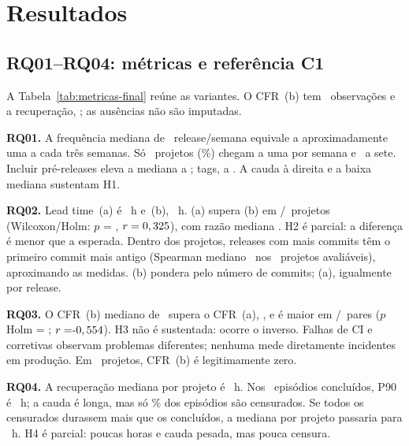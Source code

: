 \section{Resultados}
\label{sec:resultados}

\subsection{RQ01--RQ04: métricas e referência C1}

A Tabela~\ref{tab:metricas-final} reúne as variantes. O CFR~(b) tem
\labACfrBN\ observações e a recuperação, \labARecN; as ausências não são imputadas.

\begin{table}[htbp]
\centering\footnotesize
\caption{Medianas e quartis; peso igual por projeto, exceto episódios na última linha.}
\label{tab:metricas-final}

\end{table}

\textbf{RQ01.} A frequência mediana de \labAFreqMediana\ release/semana equivale
a aproximadamente uma a cada três semanas. Só \labAFreqSemanais\ projetos
(\labAFreqSemanaisPct\%) chegam a uma por semana e \labAFreqDiarios\ a sete.
Incluir pré-releases eleva a mediana a \labAFreqPreMediana; tags, a
\labAFreqTagsMediana. A cauda à direita e a baixa mediana sustentam H1.

\textbf{RQ02.} Lead time~(a) é \labALeadAMediana~h e~(b), \labALeadBMediana~h.
(a) supera (b) em \labALeadXMaior/\labALeadAN\ projetos (Wilcoxon/Holm:
$p$ = \labALeadPHolm, $r=0,325$), com razão mediana \labALeadRazao.
H2 é parcial: a diferença é menor que a esperada. Dentro dos projetos, releases
com mais commits têm o primeiro commit mais antigo (Spearman mediano
\labALeadRhoMediano\ nos \labALeadProjetosRho\ projetos avaliáveis), aproximando
as medidas. (b) pondera pelo número de commits; (a), igualmente por release.

\textbf{RQ03.} O CFR~(b) mediano de \labACfrBMediana\ supera o CFR~(a),
\labACfrAMediana, e é maior em \labACfrXMenor/\labACfrBN\ pares
($p$ Holm = \labACfrPHolm; $r=\labACfrR$). H3 não é sustentada: ocorre o inverso.
Falhas de CI e corretivas observam problemas diferentes; nenhuma mede diretamente
incidentes em produção. Em \labACfrBZeros\ projetos, CFR~(b) é legitimamente zero.

\textbf{RQ04.} A recuperação mediana por projeto é \labARecMediana~h.
Nos \labAEpN\ episódios concluídos, P90 é \labAEpPNoventa~h; a cauda é longa,
mas só \labAEpCensuradosPct\% dos episódios são censurados. Se todos os censurados
durassem mais que os concluídos, a mediana por projeto passaria para
\labARecPiorCaso~h. H4 é parcial: poucas horas e cauda pesada, mas pouca censura.


